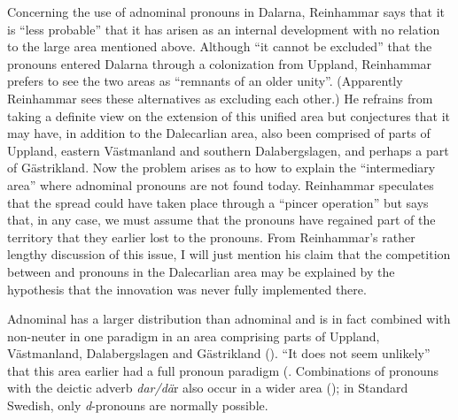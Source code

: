 Concerning the use of adnominal pronouns in Dalarna, Reinhammar says that it is “less probable” that it has arisen as an internal development with no relation to the large area mentioned above. Although “it cannot be excluded” that the pronouns entered Dalarna through a colonization from Uppland, Reinhammar prefers to see the two areas as “remnants of an older unity”. (Apparently Reinhammar sees these alternatives as excluding each other.) He refrains from taking a definite view on the extension of this unified area but conjectures that it may have, in addition to the Dalecarlian area, also been comprised of parts of Uppland, eastern Västmanland and southern Dalabergslagen, and perhaps a part of Gästrikland. Now the problem arises as to how to explain the “intermediary area” where adnominal pronouns are not found today. Reinhammar speculates that the spread could have taken place through a “pincer operation” but says that, in any case, we must assume that the pronouns have regained part of the territory that they earlier lost to the pronouns. From Reinhammar’s rather lengthy discussion of this issue, I will just mention his claim that the competition between  and pronouns in the Dalecarlian area may be explained by the hypothesis that the innovation was never fully implemented there. 

Adnominal has a larger distribution than adnominal and is in fact combined with non-neuter  in one paradigm in an area comprising parts of Uppland, Västmanland, Dalabergslagen and Gästrikland (). “It does not seem unlikely” that this area earlier had a full pronoun paradigm (\citet[43]{Reinhammar1975}. Combinations of pronouns with the deictic adverb \textit{dar/dä}r also occur in a wider area (); in Standard Swedish, only \textit{d}{}-pronouns are normally possible.   
 
 
 

